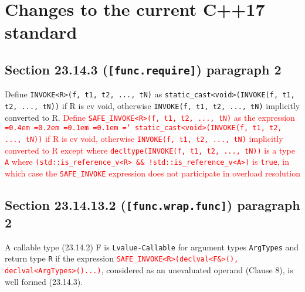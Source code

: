 \documentclass{article}
\newcommand*\justify{%
  \fontdimen2\font=0.4em%
  \fontdimen3\font=0.2em%
  \fontdimen4\font=0.1em%
  \fontdimen7\font=0.1em%
  \hyphenchar\font=`\-%
}
\begin{document}
\section{Changes to the current C++17 standard}
\subsection{Section 23.14.3 (\texttt{[func.require]}) paragraph 2}
Define \texttt{INVOKE<R>(f, t1, t2, ..., tN)} as
\texttt{static\_cast<void>(INVOKE(f, t1, t2, ..., tN))} if R is cv void,
otherwise \texttt{INVOKE(f, t1, t2, ..., tN)} implicitly converted to R.
\textcolor{red}{Define \texttt{SAFE\_INVOKE<R>(f, t1, t2, ..., tN)} as the
expression \texttt{\justify static\_cast<void>(INVOKE(f, t1, t2, ...,
tN))} if R is cv void, otherwise \texttt{INVOKE(f, t1, t2, ..., tN)}
implicitly converted to R except where \texttt{decltype(INVOKE(f, t1, t2,
..., tN))} is a type \texttt{A} where \texttt{(std::is\_reference\_v<R> \&\&
!std::is\_reference\_v<A>)} is \texttt{true}, in which case the
\texttt{SAFE\_INVOKE} expression does not participate in overload resolution}

\subsection{Section 23.14.13.2 (\texttt{[func.wrap.func]}) paragraph 2}
A callable type (23.14.2) F is \texttt{Lvalue-Callable} for argument types
\texttt{ArgTypes} and return type \texttt{R} if the expression
\textcolor{red}{\texttt{SAFE\_INVOKE<R>(declval<F&>(),
declval<ArgTypes>()...)}}, considered as an unevaluated operand (Clause 8), is
well formed (23.14.3).
\end{document}
